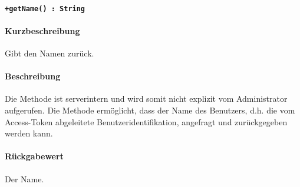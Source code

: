 \paragraph*{\texttt{+getName() : String}}%
\paragraph*{Kurzbeschreibung}
Gibt den Namen zurück.
\paragraph*{Beschreibung}
Die Methode ist serverintern und wird somit nicht explizit vom Administrator aufgerufen.
Die Methode ermöglicht, dass der Name des Benutzers, d.h. die vom Access-Token abgeleitete Benutzeridentifikation, angefragt und zurückgegeben werden kann.
\paragraph*{Rückgabewert}
Der Name.
